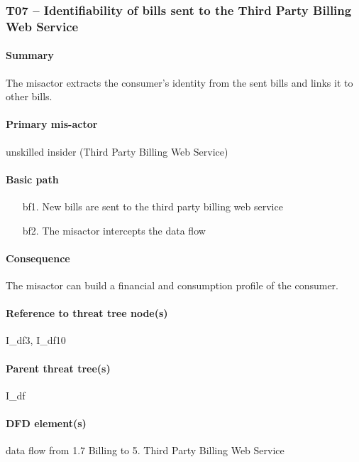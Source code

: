 \subsubsection{T07 -- Identifiability of bills sent to the Third Party Billing
Web Service}

\paragraph{Summary} The misactor extracts the consumer's identity from the sent
bills and links it to other bills.

\paragraph{Primary mis-actor} unskilled insider (Third Party Billing Web
Service)

\paragraph{Basic path}
\begin{enumerate}
	\item[bf1.] New bills are sent to the third party billing web service
	\item[bf2.] The misactor intercepts the data flow
\end{enumerate}

\paragraph{Consequence} The misactor can build a financial and consumption
profile of the consumer. 

\paragraph{Reference to threat tree node(s)} I\_df3, I\_df10

\paragraph{Parent threat tree(s)} I\_df

\paragraph{DFD element(s)} data flow from 1.7 Billing to 5. Third Party Billing
Web Service

